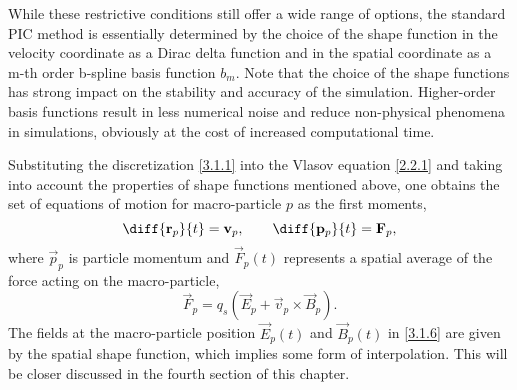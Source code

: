 While these restrictive conditions still offer a wide range of options, the standard PIC method is essentially determined by the choice of the shape function in the velocity coordinate as a Dirac delta function and in the spatial coordinate as a m-th order b-spline basis function $ b_{m} $.
Note that the choice of the shape functions has strong impact on the stability and accuracy of the simulation. Higher-order basis functions result in less numerical noise and reduce non-physical phenomena in simulations, obviously at the cost of increased computational time.

Substituting the discretization \ref{3.1.1} into the Vlasov equation \ref{2.2.1} and taking into account the properties of shape functions mentioned above, one obtains the set of equations of motion for macro-particle $ p $ as the first moments,
\begin{equation}
\label{3.1.5}
\diff{\vec{r}_{p}}{t} = \vec{v}_{p}, \qquad \diff{\vec{p}_{p}}{t} = \vec{F}_{p},
\end{equation}
where $ \vec{p}_{p} $ is particle momentum and $ \vec{F}_p \left( t\right) $ represents a spatial average of the force acting on the macro-particle,
\begin{equation}
\label{3.1.6}
\vec{F}_p = q_s \left(\vec{E}_p + \vec{v}_p \times \vec{B}_p \right).
\end{equation}
The fields at the macro-particle position $ \vec{E}_p \left( t\right) $ and $ \vec{B}_p \left( t\right) $ in \ref{3.1.6} are given by the spatial shape function, which implies some form of interpolation. This will be closer discussed in the fourth section of this chapter.

